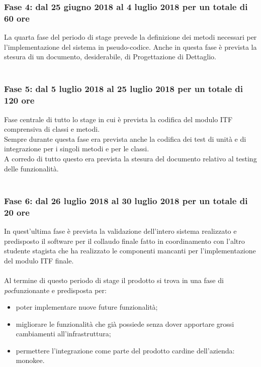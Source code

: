 \subsubsection{Fase 4: dal 25 giugno 2018 al 4 luglio 2018 per un totale di 60 ore}
La quarta fase del periodo di stage prevede la definizione dei metodi necessari per l'implementazione del sistema in pseudo-codice. Anche in questa fase è prevista la stesura di un documento, desiderabile, di Progettazione di Dettaglio.\\\\

\subsubsection{Fase 5: dal 5 luglio 2018 al 25 luglio 2018 per un totale di 120 ore}
Fase centrale di tutto lo stage in cui è prevista la codifica del modulo \gls{ITF} comprensiva di classi e metodi.\\
Sempre durante questa fase era prevista anche la codifica dei test di unità e di integrazione per i singoli metodi e per le classi.\\
A corredo di tutto questo era prevista la stesura del documento relativo al testing delle funzionalità.\\\\

\subsubsection{Fase 6: dal 26 luglio 2018 al 30 luglio 2018 per un totale di 20 ore}
In quest'ultima fase è prevista la validazione dell'intero sistema realizzato e predisposto il software per il collaudo finale fatto in coordinamento con l'altro studente stagista che ha realizzato le componenti mancanti per l'implementazione del modulo \gls{ITF} finale.\\\\

Al termine di questo periodo di stage il prodotto si trova in una fase di \emph{\gls{poc}}\glsfirstoccur funzionante e predisposta per:
\begin{itemize}
	\item poter implementare nuove future funzionalità;
	\item migliorare le funzionalità che già possiede senza dover apportare grossi cambiamenti all'infrastruttura;
	\item permettere l'integrazione come parte del prodotto cardine dell'azienda: \gls{monokee}.
\end{itemize}

